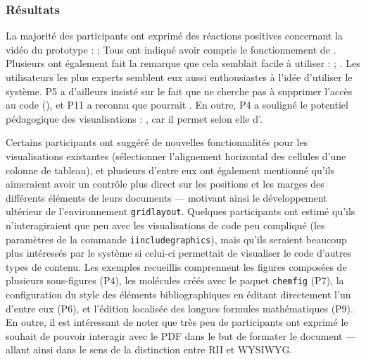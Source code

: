 \subsubsection{Résultats}
La majorité des participants ont exprimé des réactions positives concernant la vidéo du prototype :  ; 
Tous ont indiqué avoir compris le fonctionnement de \iLaTeX{}.
Plusieurs ont également fait la remarque que cela semblait facile à utiliser :  ; .
Les utilisateurs les plus experts semblent eux aussi enthousiastes à l'idée d'utiliser le système.
P5 a d'ailleurs insisté sur le fait que \iLaTeX{} ne cherche pas à supprimer l'accès au code (), et P11 a reconnu que \iLaTeX{} pourrait .
En outre, P4 a souligné le potentiel pédagogique des visualisations : , car il permet selon elle d'.

Certains participants ont suggéré de nouvelles fonctionnalités pour les visualisations existantes (\eg sélectionner l'alignement horizontal des cellules d'une colonne de tableau), et plusieurs d'entre eux ont également mentionné qu'ils aimeraient avoir un contrôle plus direct sur les positions et les marges des différents éléments de leurs documents --- motivant ainsi le développement ultérieur de l'environnement \texttt{gridlayout}.
Quelques participants ont estimé qu'ils n'interagiraient que peu avec les visualisations de code peu compliqué (\eg les paramètres de la commande \texttt{iincludegraphics}), mais qu'ils seraient beaucoup plus intéressés par le système si celui-ci permettait de visualiser le code d'autres types de contenu.
Les exemples recueillis comprennent les figures composées de plusieurs sous-figures (P4), les molécules créés avec le paquet \texttt{chemfig} (P7), la configuration du style des éléments bibliographiques en éditant directement l'un d'entre eux (P6), et l'édition localisée des longues formules mathématiques (P9).
En outre, il est intéressant de noter que très peu de participants ont exprimé le souhait de pouvoir interagir avec le PDF dans le but de formater le document --- allant ainsi dans le sens de la distinction entre RII et WYSIWYG.



